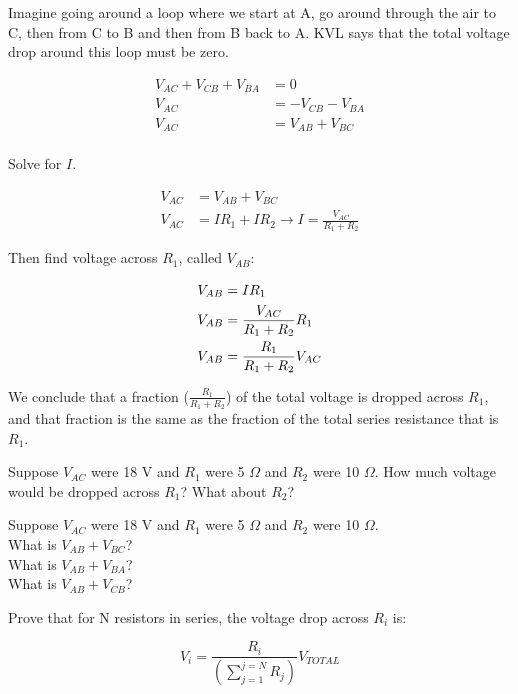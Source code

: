 Imagine going around a loop where we start at A, go around through the air to C, then from C to B and then from B back to A. KVL says that the total voltage drop around this loop must be zero.
\par
\begin{align*}
V_{AC} + V_{CB}+V_{BA}&=0\\
V_{AC} &=-V_{CB}-V_{BA}\\
V_{AC} &= V_{AB}+V_{BC} \tag{Individual Voltages Sum to Total Voltage}\\
\end{align*}

Solve for $I$. 

\begin{align*}
V_{AC} &= V_{AB}+V_{BC}\\
V_{AC} &= IR_1+IR_2 \rightarrow I=\frac{V_{AC}}{R_1+R_2}
\end{align*}

Then find voltage across $R_1$, called $V_{AB}$:

\begin{align}
V_{AB}&=IR_1\notag\\
V_{AB}&=\frac{V_{AC}}{R_1+R_2}R_1\notag\\
V_{AB}&=\frac{R_1}{R_1+R_2}V_{AC}
\end{align}

We conclude that a fraction ($\frac{R_1}{R_1+R_2}$) of the total voltage is dropped across $R_1$, and that fraction is the same as the fraction of the total series resistance that is $R_1$.
\par


\begin{alevel}
Suppose $V_{AC}$ were 18 V and $R_1$ were 5 $\Omega$ and $R_2$ were 10 $\Omega$. How much voltage would be dropped across $R_1$? What about $R_2$?
\end{alevel}

\begin{blevel}
Suppose $V_{AC}$ were 18 V and $R_1$ were 5 $\Omega$ and $R_2$ were 10 $\Omega$.\\
What is $V_{AB}+V_{BC}$?\\
What is $V_{AB}+V_{BA}$?\\
What is $V_{AB}+V_{CB}$?
\end{blevel}

\begin{dlevel}
Prove that for N resistors in series, the voltage drop across $R_i$ is:
\par
\[ V_i=\frac{R_i}{(\sum\limits_{j=1}^{j=N} R_j)}V_{TOTAL} \]
\end{dlevel}

